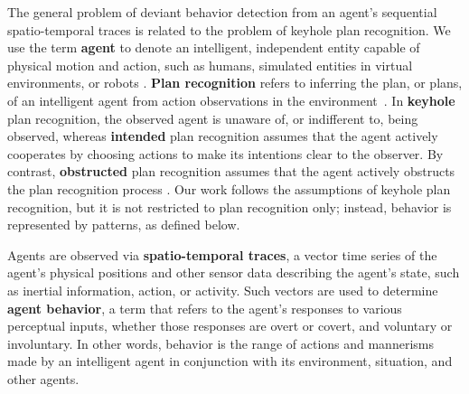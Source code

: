 The general problem of deviant behavior detection from an agent's sequential spatio-temporal traces is related to the problem of keyhole plan recognition. 
%
We use the term \textbf{agent} to denote an intelligent, independent entity capable of physical motion and action, such as humans, simulated entities in virtual environments, or robots \citep{Sukthankar-AAAI2008}. 
%
\textbf{Plan recognition} refers to inferring the plan, or plans, of an intelligent agent from action observations in the environment~\citep{Schmidt1978}. %
%
In \textbf{keyhole}  plan recognition, the observed agent is unaware of, or indifferent to, being observed, whereas \textbf{intended}  plan recognition assumes that the agent actively cooperates by choosing actions to make its intentions clear to the observer. 
By contrast, \textbf{obstructed}  plan recognition assumes that the agent actively obstructs the plan recognition process \citep{Waern1995}.
Our work follows the assumptions of keyhole plan recognition, but it is not restricted to plan recognition only; instead, behavior is represented by patterns, as defined below.


Agents are observed via \textbf{spatio-temporal traces}, a vector time series of the agent's physical positions and other sensor data describing the agent's state, such as inertial information, action, or activity. 
Such vectors are used to determine \textbf{agent behavior}, a term that refers to the agent's responses to various perceptual inputs, whether those responses are overt or covert, and voluntary or involuntary. In other words, behavior is the range of actions and mannerisms made by an intelligent agent in conjunction with its environment, situation, and other agents. 

